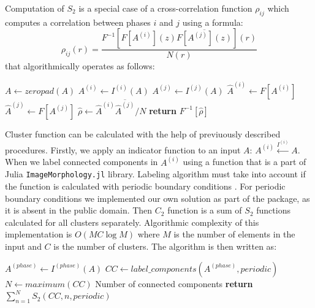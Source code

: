 \documentclass[reprint,amsmath,amssymb,aps,pre,showkeys,showpacs,nofootinbib]{revtex4-1}
\newcommand{\code}[1]{\colorbox{light-gray}{\texttt{#1}}}
\begin{document}
Computation of $S_2$ is a special case of a cross-correlation function $\rho_{ij}$
which computes a correlation between phases $i$ and $j$ using a formula:
\begin{equation}
  \rho_{ij}(r) = \frac{F^{-1} [F[A^{(i)}](z) \overline{F[A^{(j)}](z)}] (r)}{N(r)} \label{eq:cross-ft}
\end{equation}
that algorithmically operates as follows:
\begin{algorithmic}[1]
    \State $A \gets zeropad(A)$
  \EndIf
  \State $A^{(i)} \gets I^{(i)} (A)$
  \State $A^{(j)} \gets I^{(j)} (A)$
  \State $\hat{A}^{(i)} \gets F[A^{(i)}]$
  \State $\hat{A}^{(j)} \gets F[A^{(j)}]$
  \State $\hat{\rho} \gets \hat{A}^{(i)} \overline{\hat{A}^{(j)}} / N$
  \State \textbf{return} $F^{-1} [\hat{\rho}]$
  \EndProcedure
\end{algorithmic}

Cluster function can be calculated with the help of previuously described
procedures.  Firstly, we apply an indicator function to an input $A$: $A^{(i)}
\xleftarrow{I^{(i)}} A$. When we label connected components in $A^{(i)}$ using a
function that is a part of Julia \code{ImageMorphology.jl} library.  Labeling
algorithm must take into account if the function is calculated with periodic
boundary conditions \cite{evstigneev2023}. For periodic boundary conditions we
implemented our own solution as part of the package, as it is absent in the
public domain. Then $C_2$ function is a sum of $S_2$ functions calculated for
all clusters separately. Algorithmic complexity of this implementation is
$O(MC\log M)$ where $M$ is the number of elements in the input and $C$ is the
number of clusters. The algorithm is then written as:
\begin{algorithmic}[1]
  \State $A^{(phase)} \gets I^{(phase)} (A)$
  \State $CC \gets label\_components(A^{(phase)}, periodic)$
  \State $N \gets maximum(CC)$ \Comment Number of connected components
  \State \textbf{return} $\sum\limits_{n=1}^N S_2(CC, n, periodic)$
  \EndProcedure
\end{algorithmic}
\end{document}
